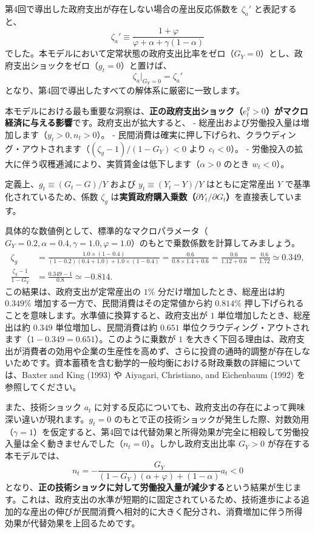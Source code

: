 \documentclass[
  japanese,
  lualatex,
  ja=standard,
  12pt,
  a4paper]{ltjsarticle}
\begin{document}
第4回で導出した政府支出が存在しない場合の産出反応係数を \(\zeta_a'\)
と表記すると、 \[
\zeta_a' \equiv \frac{1+\varphi}{\varphi + \alpha + \gamma(1-\alpha)}
\]
でした。本モデルにおいて定常状態の政府支出比率をゼロ（\(G_Y = 0\)）とし、政府支出ショックをゼロ（\(g_t = 0\)）と置けば、
\[
\zeta_a \Big|_{G_Y=0} = \zeta_a'
\] となり、第4回で導出したすべての解体系に厳密に一致します。

本モデルにおける最も重要な洞察は、\textbf{正の政府支出ショック（\(e_t^g > 0\)）がマクロ経済に与える影響}です。政府支出が拡大すると、
- 総産出および労働投入量は増加します（\(y_t > 0, n_t > 0\)）。 -
民間消費は確実に押し下げられ、クラウディング・アウトされます（\((\zeta_g - 1)/(1-G_Y) < 0\)
より \(c_t < 0\)）。 -
労働投入の拡大に伴う収穫逓減により、実質賃金は低下します（\(\alpha > 0\)
のとき \(w_t < 0\)）。

定義上、\(g_t \equiv (G_t - G)/Y\) および \(y_t \equiv (Y_t - Y)/Y\)
はともに定常産出 \(Y\) で基準化されているため、係数 \(\zeta_g\)
は\textbf{実質政府購入乗数（\(\partial Y_t / \partial G_t\)）}を直接表しています。

具体的な数値例として、標準的なマクロパラメータ（\(G_Y = 0.2, \alpha = 0.4, \gamma = 1.0, \varphi = 1.0\)）のもとで乗数係数を計算してみましょう。
\[
\begin{aligned}
\zeta_g &= \frac{1.0 \times (1 - 0.4)}{(1 - 0.2)(0.4 + 1.0) + 1.0 \times (1 - 0.4)} = \frac{0.6}{0.8 \times 1.4 + 0.6} = \frac{0.6}{1.12 + 0.6} = \frac{0.6}{1.72} \simeq 0.349,\\[8pt]
\frac{\zeta_g - 1}{1-G_Y} &= \frac{0.349 - 1}{0.8} \simeq -0.814.
\end{aligned}
\] この結果は、政府支出が定常産出の \(1\%\)
分だけ増加したとき、総産出は約 \(0.349\%\)
増加する一方で、民間消費はその定常値から約 \(0.814\%\)
押し下げられることを意味します。水準値に換算すると、政府支出が \(1\)
単位増加したとき、総産出は約 \(0.349\) 単位増加し、民間消費は約
\(0.651\)
単位クラウディング・アウトされます（\(1 - 0.349 = 0.651\)）。このように乗数が
\(1\)
を大きく下回る理由は、政府支出が消費者の効用や企業の生産性を高めず、さらに投資の通時的調整が存在しないためです。資本蓄積を含む動学的一般均衡における財政乗数の詳細については、Baxter
and King (1993) や Aiyagari, Christiano, and Eichenbaum (1992)
を参照してください。

また、技術ショック \(a_t\)
に対する反応についても、政府支出の存在によって興味深い違いが現れます。\(g_t = 0\)
のもとで正の技術ショックが発生した際、対数効用（\(\gamma = 1\)）を仮定すると、第4回では代替効果と所得効果が完全に相殺して労働投入量は全く動きませんでした（\(n_t = 0\)）。しかし政府支出比率
\(G_Y > 0\) が存在する本モデルでは、 \[
n_t = -\frac{G_Y}{(1-G_Y)(\alpha+\varphi) + (1-\alpha)} a_t < 0
\]
となり、\textbf{正の技術ショックに対して労働投入量が減少する}という結果が生じます。これは、政府支出の水準が短期的に固定されているため、技術進歩による追加的な産出の伸びが民間消費へ相対的に大きく配分され、消費増加に伴う所得効果が代替効果を上回るためです。
\end{document}
